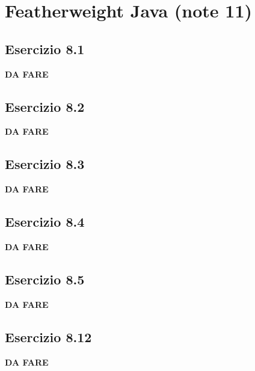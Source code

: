 \section{Featherweight Java (note 11)}
\subsection*{Esercizio 8.1} 
\textbf{{\color{red} DA FARE}}

\subsection*{Esercizio 8.2} 
\textbf{{\color{red} DA FARE}}

\subsection*{Esercizio 8.3} 
\textbf{{\color{red} DA FARE}}

\subsection*{Esercizio 8.4} 
\textbf{{\color{red} DA FARE}}

\subsection*{Esercizio 8.5} 
\textbf{{\color{red} DA FARE}}

\subsection*{Esercizio 8.12} 
\textbf{{\color{red} DA FARE}}